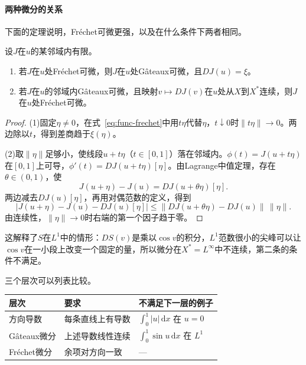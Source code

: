 \paragraph{两种微分的关系}
下面的定理说明，Fréchet可微更强，以及在什么条件下两者相同。

\begin{theorem}[Gâteaux与Fréchet]
\label{thm:func-gateaux-frechet}
设$J$在$u$的某邻域内有限。
\begin{enumerate}
 \item 若$J$在$u$处Fréchet可微，则$J$在$u$处Gâteaux可微，且$DJ(u)=\xi$。
 \item 若$J$在$u$的邻域内Gâteaux可微，且映射$v\mapsto DJ(v)$在$u$处从$X$到$X^*$连续，则$J$在$u$处Fréchet可微。
\end{enumerate}
\end{theorem}

\begin{proof}
(1)固定$\eta\neq0$，在式~\eqref{eq:func-frechet}中用$t\eta$代替$\eta$，$t\downarrow0$时$\lVert t\eta\rVert\to0$。两边除以$t$，得到差商趋于$\xi(\eta)$。

(2)取$\lVert\eta\rVert$足够小，使线段$u+t\eta$（$t\in[0,1]$）落在邻域内。$\phi(t)=J(u+t\eta)$在$[0,1]$上可导，$\phi'(t)=DJ(u+t\eta)[\eta]$。由Lagrange中值定理，存在$\theta\in(0,1)$，使
\[
 J(u+\eta)-J(u)=DJ(u+\theta\eta)[\eta].
\]
两边减去$DJ(u)[\eta]$，再用对偶范数的定义，得到
\[
 \bigl\lvert J(u+\eta)-J(u)-DJ(u)[\eta]\bigr\rvert\leq\lVert DJ(u+\theta\eta)-DJ(u)\rVert\,\lVert\eta\rVert.
\]
由连续性，$\lVert\eta\rVert\to0$时右端的第一个因子趋于零。
\end{proof}

这解释了$S$在$L^1$中的情形：$DS(v)$是乘以$\cos v$的积分，$L^1$范数很小的尖峰可以让$\cos v$在一小段上改变一个固定的量，所以微分在$X^*=L^\infty$中不连续，第二条的条件不满足。

三个层次可以列表比较。

\begin{BookInlineTable}
  \centering
  \caption{一阶信息的三个层次。}
  \label{tab:func-derivative-levels}
  \begin{tabular}{lll}
    \toprule
    层次 & 要求 & 不满足下一层的例子\\
    \midrule
    方向导数 & 每条直线上有导数 & $\int_0^1\lvert u\rvert\,\mathrm{d}x$ 在 $u=0$\\
    Gâteaux微分 & 上述导数线性连续 & $\int_0^1\sin u\,\mathrm{d}x$ 在 $L^1$\\
    Fréchet微分 & 余项对方向一致 & ---\\
    \bottomrule
  \end{tabular}
\end{BookInlineTable}

